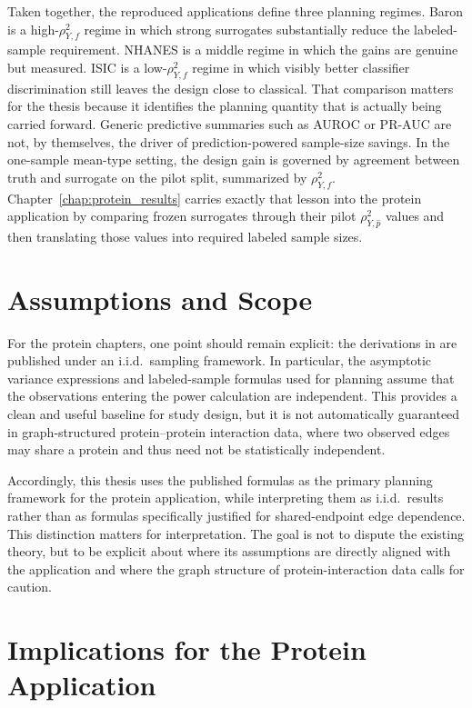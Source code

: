 Taken together, the reproduced applications define three planning regimes. Baron is a high-\(\rho_{Y,f}^2\) regime in which strong surrogates substantially reduce the labeled-sample requirement. NHANES is a middle regime in which the gains are genuine but measured. ISIC is a low-\(\rho_{Y,f}^2\) regime in which visibly better classifier discrimination still leaves the design close to classical. That comparison matters for the thesis because it identifies the planning quantity that is actually being carried forward. Generic predictive summaries such as AUROC or PR-AUC are not, by themselves, the driver of prediction-powered sample-size savings. In the one-sample mean-type setting, the design gain is governed by agreement between truth and surrogate on the pilot split, summarized by \(\rho_{Y,f}^2\). Chapter~\ref{chap:protein_results} carries exactly that lesson into the protein application by comparing frozen surrogates through their pilot \(\rho_{Y,\hat p}^2\) values and then translating those values into required labeled sample sizes.

\section{Assumptions and Scope}

For the protein chapters, one point should remain explicit: the derivations in \textcite{ppi_power} are published under an i.i.d.\ sampling framework. In particular, the asymptotic variance expressions and labeled-sample formulas used for planning assume that the observations entering the power calculation are independent. This provides a clean and useful baseline for study design, but it is not automatically guaranteed in graph-structured protein--protein interaction data, where two observed edges may share a protein and thus need not be statistically independent.

Accordingly, this thesis uses the published formulas as the primary planning framework for the protein application, while interpreting them as i.i.d.\ results rather than as formulas specifically justified for shared-endpoint edge dependence. This distinction matters for interpretation. The goal is not to dispute the existing theory, but to be explicit about where its assumptions are directly aligned with the application and where the graph structure of protein-interaction data calls for caution.



\section{Implications for the Protein Application}

